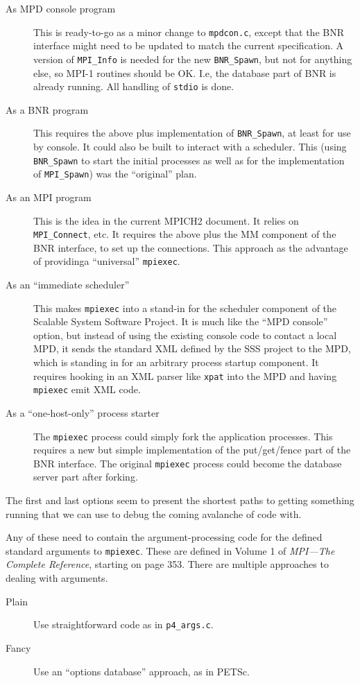 \documentclass{article}
\def\code{\begingroup\makeustext\eatcode}
\def\eatcode#1{\texttt{#1}\endgroup}
\let\file=\code
\begin{document}
\begin{description}
\item[As MPD console program] This is ready-to-go as a minor change to
  \file{mpdcon.c}, except that the BNR interface might need to be updated to
  match 
  the current specification.  A version of \code{MPI_Info} is needed for the
  new 
  \code{BNR_Spawn}, but not for anything else, so MPI-1 routines should be OK.
  I.e, 
  the database part of BNR is already running.  All handling of \code{stdio}
  is done.
\item[As a BNR program] This requires the above plus implementation of
  \code{BNR_Spawn}, at least for use by console.  It could also be built to
  interact 
  with a scheduler.  This (using \code{BNR_Spawn} to start the initial
  processes as 
  well as for the implementation of \code{MPI_Spawn}) was the ``original''
  plan.
\item[As an MPI program] This is the idea in the current MPICH2 document.  It
  relies on \code{MPI_Connect}, etc.  It requires the above plus the MM
  component 
  of the BNR interface, to set up the connections.  This approach as the
  advantage of providinga ``universal'' \code{mpiexec}. 
\item[As an ``immediate scheduler''] This makes \code{mpiexec} into a stand-in
  for the scheduler component of the Scalable System Software Project.  It is
  much like the ``MPD console'' option, but instead of using the existing
  console code to contact a local MPD, it sends the standard XML defined by
  the SSS project to the MPD, which is standing in for an arbitrary process
  startup component.  It requires hooking in an XML parser like \code{xpat}
  into the MPD and having \code{mpiexec} emit XML code.
\item[As a ``one-host-only'' process starter] The \code{mpiexec} process could
  simply fork the application processes.  This requires a new but simple
  implementation of the put/get/fence part of the BNR interface.  The original
  \code{mpiexec} process could become the database server part after forking.
\end{description}

The first and last options seem to present the shortest paths to getting
something running that we can use to debug the coming avalanche of code with.

Any of these need to contain the argument-processing code for the defined
standard arguments to \code{mpiexec}.  These are defined in Volume 1 of \emph{ MPI---The Complete Reference}, starting on page 353.  There are multiple
approaches to dealing with arguments.
\begin{description}
\item[Plain] Use straightforward code as in \file{p4_args.c}.
\item[Fancy] Use an ``options database'' approach, as in PETSc.
\end{description}
\end{document}
